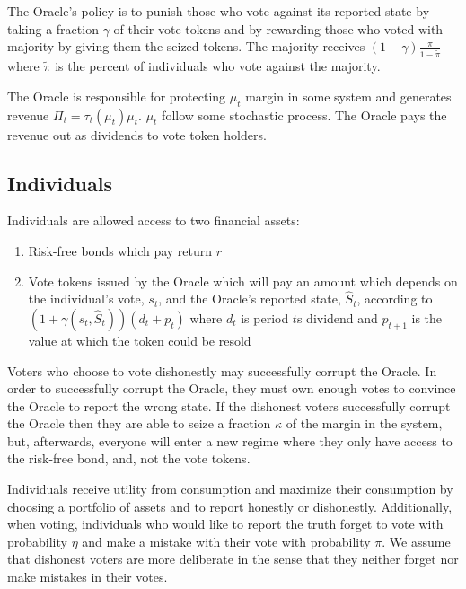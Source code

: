 \documentclass[12pt]{article}
\begin{document}
    The Oracle's policy is to punish those who vote against its reported state by taking a fraction
    $\gamma$ of their vote tokens and by rewarding those who voted with majority by giving them the
    seized tokens. The majority receives $(1 - \gamma) \frac{\tilde{\pi}}{1 - \tilde{\pi}}$ where
    $\tilde{\pi}$ is the percent of individuals who vote against the majority.

    The Oracle is responsible for protecting $\mu_t$ margin in some system and generates revenue
    $\Pi_t = \tau_t(\mu_t) \mu_t$. $\mu_t$ follow some stochastic process. The Oracle pays the
    revenue out as dividends to vote token holders.

  \subsection{Individuals}

    Individuals are allowed access to two financial assets:

    \begin{enumerate}
      \item Risk-free bonds which pay return $r$
      \item Vote tokens issued by the Oracle which will pay an amount which depends on the
            individual's vote, $s_t$, and the Oracle's reported state, $\hat{S}_t$, according to
            $(1 + \gamma(s_t, \hat{S}_t)) (d_t + p_t)$ where $d_t$ is period $t$s dividend and
            $p_{t+1}$ is the value at which the token could be resold
    \end{enumerate}

    Voters who choose to vote dishonestly may successfully corrupt the Oracle. In order to
    successfully corrupt the Oracle, they must own enough votes to convince the Oracle to report
    the wrong state. If the dishonest voters successfully corrupt the Oracle then they are able to
    seize a fraction $\kappa$ of the margin in the system, but, afterwards, everyone will enter a
    new regime where they only have access to the risk-free bond, and, not the vote tokens.

    Individuals receive utility from consumption and maximize their consumption by choosing a
    portfolio of assets and to report honestly or dishonestly. Additionally, when voting,
    individuals who would like to report the truth forget to vote with probability $\eta$ and make a
    mistake with their vote with probability $\pi$. We assume that dishonest voters are more
    deliberate in the sense that they neither forget nor make mistakes in their votes.
\end{document}
